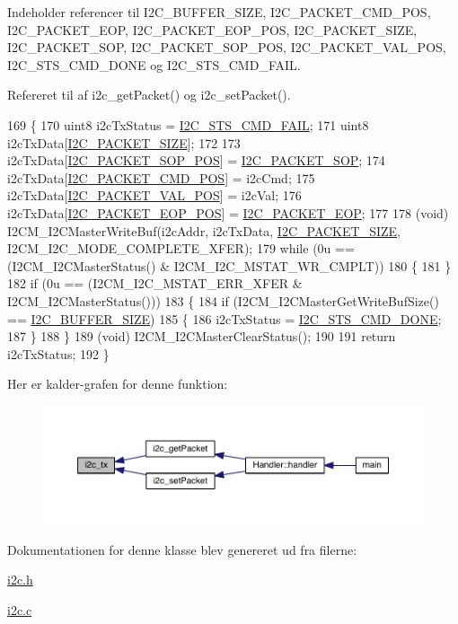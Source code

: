 Indeholder referencer til I2\+C\+\_\+\+B\+U\+F\+F\+E\+R\+\_\+\+S\+I\+ZE, I2\+C\+\_\+\+P\+A\+C\+K\+E\+T\+\_\+\+C\+M\+D\+\_\+\+P\+OS, I2\+C\+\_\+\+P\+A\+C\+K\+E\+T\+\_\+\+E\+OP, I2\+C\+\_\+\+P\+A\+C\+K\+E\+T\+\_\+\+E\+O\+P\+\_\+\+P\+OS, I2\+C\+\_\+\+P\+A\+C\+K\+E\+T\+\_\+\+S\+I\+ZE, I2\+C\+\_\+\+P\+A\+C\+K\+E\+T\+\_\+\+S\+OP, I2\+C\+\_\+\+P\+A\+C\+K\+E\+T\+\_\+\+S\+O\+P\+\_\+\+P\+OS, I2\+C\+\_\+\+P\+A\+C\+K\+E\+T\+\_\+\+V\+A\+L\+\_\+\+P\+OS, I2\+C\+\_\+\+S\+T\+S\+\_\+\+C\+M\+D\+\_\+\+D\+O\+NE og I2\+C\+\_\+\+S\+T\+S\+\_\+\+C\+M\+D\+\_\+\+F\+A\+IL.



Refereret til af i2c\+\_\+get\+Packet() og i2c\+\_\+set\+Packet().


\begin{DoxyCode}
169 \{
170   uint8 i2cTxStatus = \hyperlink{i2c_8h_aee0adbd7dcb13e95337369b7342a27e3}{I2C\_STS\_CMD\_FAIL};
171   uint8 i2cTxData[\hyperlink{i2c_8h_a8c24abf58121f3c16b5f687cc2946cd1}{I2C\_PACKET\_SIZE}];
172   
173   i2cTxData[\hyperlink{i2c_8h_a1207f4b2c3692b1a344f0013da629310}{I2C\_PACKET\_SOP\_POS}] = \hyperlink{i2c_8h_a52bb5b964361ed2f1b18df32c5b8f2c5}{I2C\_PACKET\_SOP};
174   i2cTxData[\hyperlink{i2c_8h_ac13fcfeded7dc2d82fa4734456f3761f}{I2C\_PACKET\_CMD\_POS}] = i2cCmd;
175   i2cTxData[\hyperlink{i2c_8h_a68506c3651f015716bb2c135e8e7b972}{I2C\_PACKET\_VAL\_POS}] = i2cVal;
176   i2cTxData[\hyperlink{i2c_8h_a940f0ea8103872c7ba81b9dc0f121feb}{I2C\_PACKET\_EOP\_POS}] = \hyperlink{i2c_8h_a62b4ae6e51a3d0da47f5165165cdbc0a}{I2C\_PACKET\_EOP};
177   
178   (void) I2CM\_I2CMasterWriteBuf(i2cAddr, i2cTxData, \hyperlink{i2c_8h_a8c24abf58121f3c16b5f687cc2946cd1}{I2C\_PACKET\_SIZE}, 
      I2CM\_I2C\_MODE\_COMPLETE\_XFER);
179   \textcolor{keywordflow}{while} (0u == (I2CM\_I2CMasterStatus() & I2CM\_I2C\_MSTAT\_WR\_CMPLT))
180   \{
181   \}
182   \textcolor{keywordflow}{if} (0u == (I2CM\_I2C\_MSTAT\_ERR\_XFER & I2CM\_I2CMasterStatus()))
183   \{
184     \textcolor{keywordflow}{if} (I2CM\_I2CMasterGetWriteBufSize() == \hyperlink{i2c_8h_a6458dbf193a0eef0470fc1b08400bfcd}{I2C\_BUFFER\_SIZE})
185     \{
186       i2cTxStatus = \hyperlink{i2c_8h_a7f8f53679384fa228bf06779cc168cfd}{I2C\_STS\_CMD\_DONE};
187     \}
188   \}
189   (void) I2CM\_I2CMasterClearStatus();
190   
191   \textcolor{keywordflow}{return} i2cTxStatus;
192 \}
\end{DoxyCode}


Her er kalder-\/grafen for denne funktion\+:
\nopagebreak
\begin{figure}[H]
\begin{center}
\leavevmode
\includegraphics[width=350pt]{d4/d47/class_i2_c_a6e8687e512564fb2b0201d5fdbecba65_icgraph}
\end{center}
\end{figure}




Dokumentationen for denne klasse blev genereret ud fra filerne\+:\begin{DoxyCompactItemize}
\item 
\hyperlink{i2c_8h}{i2c.\+h}\item 
\hyperlink{i2c_8c}{i2c.\+c}\end{DoxyCompactItemize}
